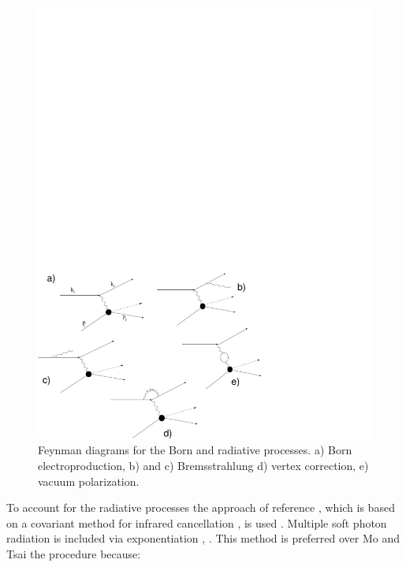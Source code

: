 \begin{figure}[h]
 \begin{center}
  \includegraphics[width=14cm, bb=-60 -40 480 380]{analysis/img/rad}
  \caption[Feynman diagrams for the Born and radiative processes]
          { Feynman diagrams for the Born and radiative processes.
	             a) Born electroproduction, b) and c) Bremsstrahlung d) vertex
		     correction, e) vacuum polarization.}
 \label{fig:rad}
  \end{center} 
\end{figure} 

To account for the radiative processes the approach of reference \cite{bib:radcorr}, which is based on a 
covariant method for infrared cancellation \cite{bib:radinfra}, is used . 
Multiple soft photon radiation is included via exponentiation \cite{bib:shum}, \cite{bib:YFS}.
This method is preferred
over Mo and Tsai the procedure \cite{bib:motsai} because:

